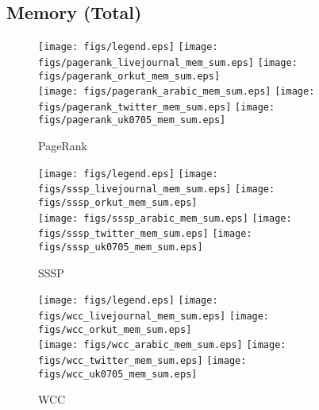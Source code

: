 \documentclass{article}
\newcommand{\bline}[1][1]{\vspace{#1\baselineskip}}
\begin{document}
\pagebreak
\subsection{Memory (Total)}
\begin{figure}[!h]
  \bline[1]
  \centering
  \texttt{[image: figs/legend.eps]}\hspace{3em}%
  \texttt{[image: figs/pagerank\_livejournal\_mem\_sum.eps]}\hspace{1em}%
  \texttt{[image: figs/pagerank\_orkut\_mem\_sum.eps]}\\
  \texttt{[image: figs/pagerank\_arabic\_mem\_sum.eps]}\hspace{1em}%
  \texttt{[image: figs/pagerank\_twitter\_mem\_sum.eps]}\hspace{1em}%
  \texttt{[image: figs/pagerank\_uk0705\_mem\_sum.eps]}
  \caption{PageRank}
\end{figure}

\begin{figure}[!h]
  \bline[3.5]
  \centering
  \texttt{[image: figs/legend.eps]}\hspace{3em}%
  \texttt{[image: figs/sssp\_livejournal\_mem\_sum.eps]}\hspace{1em}%
  \texttt{[image: figs/sssp\_orkut\_mem\_sum.eps]}\\
  \texttt{[image: figs/sssp\_arabic\_mem\_sum.eps]}\hspace{1em}%
  \texttt{[image: figs/sssp\_twitter\_mem\_sum.eps]}\hspace{1em}%
  \texttt{[image: figs/sssp\_uk0705\_mem\_sum.eps]}
  \caption{SSSP}
\end{figure}

\begin{figure}[!h]
  \bline[3.5]
  \centering
  \texttt{[image: figs/legend.eps]}\hspace{3em}%
  \texttt{[image: figs/wcc\_livejournal\_mem\_sum.eps]}\hspace{1em}%
  \texttt{[image: figs/wcc\_orkut\_mem\_sum.eps]}\\
  \texttt{[image: figs/wcc\_arabic\_mem\_sum.eps]}\hspace{1em}%
  \texttt{[image: figs/wcc\_twitter\_mem\_sum.eps]}\hspace{1em}%
  \texttt{[image: figs/wcc\_uk0705\_mem\_sum.eps]}
  \caption{WCC}
\end{figure}
\end{document}
